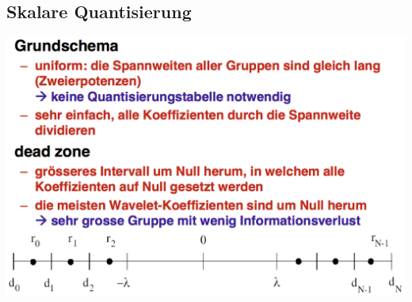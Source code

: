 \documentclass[10pt]{article}
\begin{document}
\subsection{Skalare Quantisierung}
\begin{center}
	\includegraphics[scale=0.2]{pgf-skalare-quantisierung.png}
\end{center}
\end{document}
